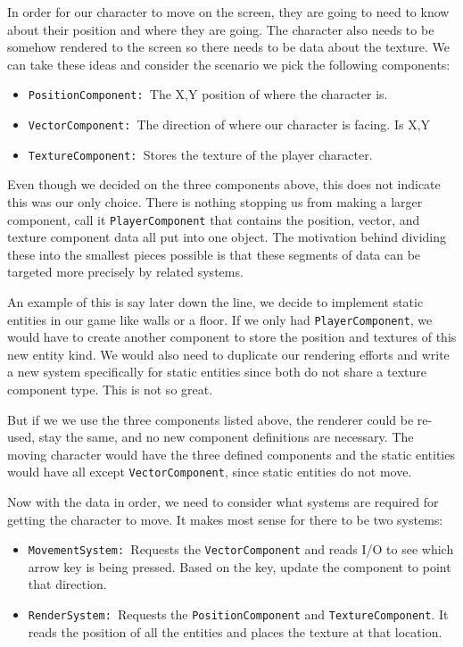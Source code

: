 In order for our character to move on the screen, they are going to need to know about their position and where they are going. The character also needs to be somehow rendered to the screen so there needs to be data about the texture. We can take these ideas and consider the scenario we pick the following components:

\begin{itemize}
    \item \texttt{PositionComponent: }The X,Y position of where the character is.
    \item \texttt{VectorComponent: }The direction of where our character is facing. Is X,Y
    \item \texttt{TextureComponent: }Stores the texture of the player character.
\end{itemize}

Even though we decided on the three components above, this does not indicate this was our only choice. There is nothing stopping us from making a larger component, call it \texttt{PlayerComponent} that contains the position, vector, and texture component data all put into one object. The motivation behind dividing these into the smallest pieces possible is that these segments of data can be targeted more precisely by related systems. 

An example of this is say later down the line, we decide to implement static entities in our game like walls or a floor. If we only had \texttt{PlayerComponent}, we would have to create another component to store the position and textures of this new entity kind. We would also need to duplicate our rendering efforts and write a new system specifically for static entities since both do not share a texture component type. This is not so great. 

But if we we use the three components listed above, the renderer could be re-used, stay the same, and no new component definitions are necessary. The moving character would have the three defined components and the static entities would have all except \texttt{VectorComponent}, since static entities do not move.

Now with the data in order, we need to consider what systems are required for getting the character to move. It makes most sense for there to be two systems:

\begin{itemize}
    \item \texttt{MovementSystem: }Requests the \texttt{VectorComponent} and reads I/O to see which arrow key is being pressed. Based on the key, update the component to point that direction.
    \item \texttt{RenderSystem: }Requests the \texttt{PositionComponent} and \texttt{TextureComponent}. It reads the position of all the entities and places the texture at that location. 
\end{itemize}

